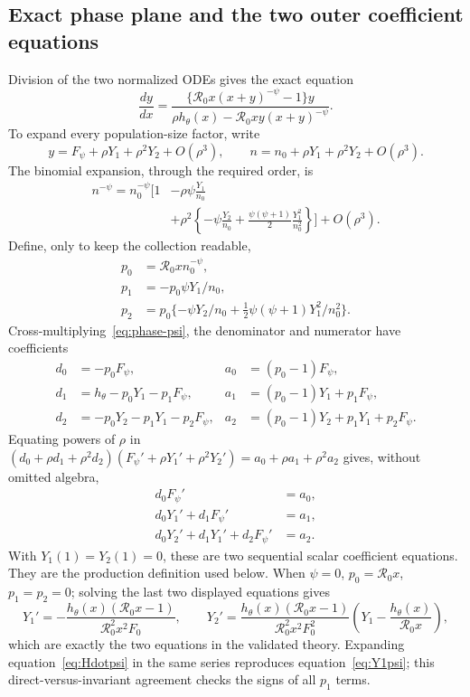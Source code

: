 \documentclass[11pt,a4paper]{article}
\newcommand{\Rzero}{\mathcal R_0}
\begin{document}
\subsection{Exact phase plane and the two outer coefficient equations}
Division of the two normalized ODEs gives the exact equation
\begin{equation}
 \frac{dy}{dx}=
 \frac{\{\Rzero x(x+y)^{-\psi}-1\}y}
 {\rho h_\theta(x)-\Rzero xy(x+y)^{-\psi}}.
 \label{eq:phase-psi}
\end{equation}
To expand every population-size factor, write
\[
 y=F_\psi+\rho Y_1+\rho^2Y_2+O(\rho^3),\qquad
 n=n_0+\rho Y_1+\rho^2Y_2+O(\rho^3).
\]
The binomial expansion, through the required order, is
\begin{align*}
 n^{-\psi}=n_0^{-\psi}\bigg[1
 &-\rho\psi\frac{Y_1}{n_0}\nonumber\\
 &+\rho^2\left\{-\psi\frac{Y_2}{n_0}
 +\frac{\psi(\psi+1)}2\frac{Y_1^2}{n_0^2}\right\}\bigg]
 +O(\rho^3).
\end{align*}
Define, only to keep the collection readable,
\begin{align*}
 p_0&=\Rzero x n_0^{-\psi},\\
 p_1&=-p_0\psi Y_1/n_0,\\
 p_2&=p_0\{-\psi Y_2/n_0+\tfrac12\psi(\psi+1)Y_1^2/n_0^2\}.
\end{align*}
Cross-multiplying~\eqref{eq:phase-psi}, the denominator and numerator have
coefficients
\begin{align*}
 d_0&=-p_0F_\psi,&a_0&=(p_0-1)F_\psi,\\
 d_1&=h_\theta-p_0Y_1-p_1F_\psi,
 &a_1&=(p_0-1)Y_1+p_1F_\psi,\\
 d_2&=-p_0Y_2-p_1Y_1-p_2F_\psi,
 &a_2&=(p_0-1)Y_2+p_1Y_1+p_2F_\psi.
\end{align*}
Equating powers of $\rho$ in
$(d_0+\rho d_1+\rho^2d_2)(F_\psi'+\rho Y_1'+\rho^2Y_2')
=a_0+\rho a_1+\rho^2a_2$ gives, without omitted algebra,
\begin{align}
 d_0F_\psi'&=a_0,\nonumber\\
 d_0Y_1'+d_1F_\psi'&=a_1,\label{eq:Y1psi}\\
 d_0Y_2'+d_1Y_1'+d_2F_\psi'&=a_2.\label{eq:Y2psi}
\end{align}
With $Y_1(1)=Y_2(1)=0$, these are two sequential scalar coefficient
equations.  They are the production definition used below.  When $\psi=0$,
$p_0=\Rzero x$, $p_1=p_2=0$; solving the last two displayed equations gives
\[
 Y_1'=-\frac{h_\theta(x)(\Rzero x-1)}
 {\Rzero^2x^2F_0},\qquad
 Y_2'=\frac{h_\theta(x)(\Rzero x-1)}
 {\Rzero^2x^2F_0^2}
 \left(Y_1-\frac{h_\theta(x)}{\Rzero x}\right),
\]
which are exactly the two equations in the validated theory.  Expanding
equation~\eqref{eq:Hdotpsi} in the same series reproduces
equation~\eqref{eq:Y1psi}; this direct-versus-invariant agreement checks the
signs of all $p_1$ terms.
\end{document}
